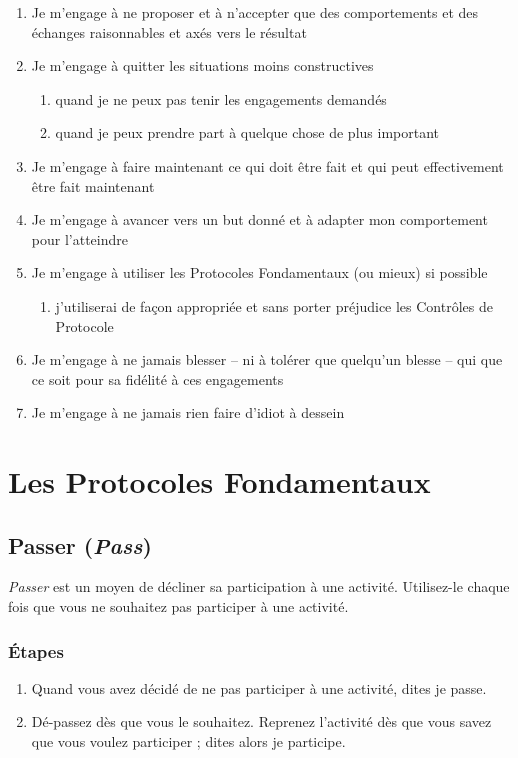\documentclass[11pt]{book}
\let\oldsection\section
\renewcommand\section{\clearpage\oldsection}
\begin{document}
\begin{enumerate}
	\item Je m'engage à ne proposer et à n'accepter que des comportements et des échanges raisonnables et axés vers le résultat
	\item Je m'engage à quitter les situations moins constructives
	\begin{enumerate}
		\item quand je ne peux pas tenir les engagements demandés
		\item quand je peux prendre part à quelque chose de plus important
	\end{enumerate}
	\item Je m'engage à faire maintenant ce qui doit être fait et qui peut effectivement être fait maintenant
	\item Je m'engage à avancer vers un but donné et à adapter mon comportement pour l'atteindre
	\item Je m'engage à utiliser les Protocoles Fondamentaux (ou mieux) si possible
	\begin{enumerate}
		\item j'utiliserai de façon appropriée et sans porter préjudice les Contrôles de Protocole
	\end{enumerate}
	\item Je m'engage à ne jamais blesser -- ni à tolérer que quelqu'un blesse -- qui que ce soit pour sa fidélité à ces engagements
	\item Je m'engage à ne jamais rien faire d'idiot à dessein
\end{enumerate}

\chapter{Les Protocoles Fondamentaux} \label{core-protocols}

\section{Passer (\emph{Pass})} \label{protocole-passer}

\emph{Passer} est un moyen de décliner sa participation à une activité. Utilisez-le chaque fois que vous ne souhaitez pas
participer à une activité.

\subsection{Étapes}
\begin{enumerate}
	\item Quand vous avez décidé de ne pas participer à une activité, dites \og{}je passe\fg{}.
	\item \og{}Dé-passez\fg{} dès que vous le souhaitez. Reprenez l'activité dès que vous savez que vous voulez participer ;
	      dites alors \og{}je participe\fg{}.
\end{enumerate}
\end{document}
